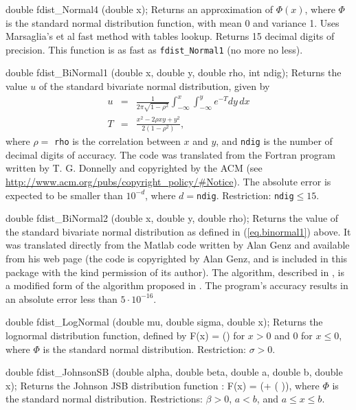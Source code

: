 double fdist_Normal4 (double x);
\endcode
  \tab  
  Returns an approximation of $\Phi(x)$,  where $\Phi$ is the standard
  normal distribution function, with mean 0 and variance 1. 
   Uses Marsaglia's et al \cite{rMAR94b} fast method
  with tables lookup. Returns 15 decimal digits of precision.
  This function is as fast as {\tt fdist\_Normal1} (no more no less).
 \endtab
\code


double fdist_BiNormal1 (double x, double y, double rho, int ndig);
\endcode
  \tab  
  Returns the value $u$ of the standard bivariate normal distribution,
  given by
\begin{eqnarray}
     u &=&  \frac{1}{2\pi\sqrt{1 - \rho^2}} \int_{-\infty}^x
              \int_{-\infty}^y e^{-T} dy\, dx  \label{eq.binormal1} \\[5pt]
     T &=& \frac{x^2 -2\rho x y + y^2}{2(1-\rho^2)}, \nonumber
\end{eqnarray}
  where $\rho = ${ \tt rho} is the correlation between $x$ and $y$, and
 \texttt{ndig} is the number of decimal digits of accuracy.
  The code was translated from the Fortran program written
   by T. G. Donnelly \cite{tDON73a} and copyrighted by the ACM (see 
  \url{http://www.acm.org/pubs/copyright_policy/#Notice}). The absolute error
  is expected to be smaller than $10^{-d}$, where $d={}$\texttt{ndig}.
  Restriction: \texttt{ndig}${} \le 15$.
 \endtab
\code


double fdist_BiNormal2 (double x, double y, double rho);
\endcode
  \tab  
  Returns the value of the standard bivariate normal distribution as 
  defined in (\ref{eq.binormal1}) above.
  It was translated directly from the Matlab code written by Alan Genz
  and available from his web page (the code is copyrighted by Alan Genz, 
  and is included in this package with the kind permission of its author).
  The algorithm, described in \cite{tGEN04a}, is a modified form of the 
  algorithm proposed in \cite{tDRE89a}. The program's accuracy results
  in an absolute error less than $5 \cdot 10^{-16}$. 
 \endtab
\code


double fdist_LogNormal (double mu, double sigma, double x);
\endcode
  \tab
  Returns the lognormal distribution function, defined by \cite{tJOH95a}
  \eq
     F(x) = \Phi \left(\right)
  \endeq
  for $x>0$ and 0 for $x\le 0$,
  where $\Phi$ is the standard normal distribution.
  Restriction: $\sigma > 0$.
 \endtab
\code


double fdist_JohnsonSB (double alpha, double beta, double a, double b,
                        double x);
\endcode
  \tab
  Returns the Johnson JSB distribution function \cite{sLAW00a}:
 \eq
   F(x) = \Phi\left(\alpha + \beta\ln\left( \right)\right),
 \endeq
  where $\Phi$ is the standard normal distribution.
  Restrictions: $\beta>0$, $a < b$, and $a \le x \le b$.
 \endtab
\code



